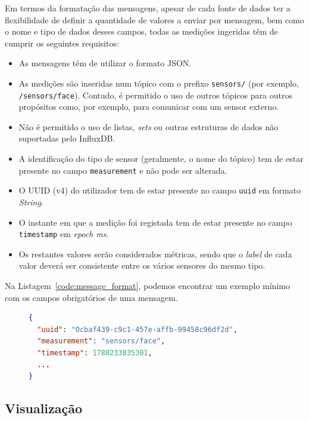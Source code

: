 Em termos da formatação das mensagens, apesar de cada fonte de dados ter a flexibilidade de definir a quantidade de valores a enviar por mensagem, bem como o nome e tipo de dados desses campos, todas as medições ingeridas têm de cumprir os seguintes requisitos:
\begin{itemize}
    \item As mensagens têm de utilizar o formato \ac{JSON}.
    \item As medições são inseridas num tópico com o prefixo \texttt{sensors/} (por exemplo, \texttt{/sensors/face}). Contudo, é permitido o uso de outros tópicos para outros propósitos como, por exemplo, para comunicar com um sensor externo.
    \item Não é permitido o uso de listas, \textit{sets} ou outras estruturas de dados não suportadas pelo InfluxDB.
    \item A identificação do tipo de sensor (geralmente, o nome do tópico) tem de estar presente no campo \texttt{measurement} e não pode ser alterada.
    \item O \ac{UUID} (v4) do utilizador tem de estar presente no campo \texttt{uuid} em formato \textit{String}.
    \item O instante em que a medição foi registada tem de estar presente no campo \texttt{timestamp} em \textit{epoch ms}.
    \item Os restantes valores serão considerados métricas, sendo que o \textit{label} de cada valor deverá ser consistente entre os vários sensores do mesmo tipo.
\end{itemize}

Na Listagem~\ref{code:message_format}, podemos encontrar um exemplo mínimo com os campos obrigatórios de uma mensagem.

\begin{figure}[h!]
\centering
\begin{minipage}{\textwidth}
\begin{lstlisting}[language=json, caption={Contrato mínimo de uma medição}, label={code:message_format}]
{
  "uuid": "Ocbaf439-c9c1-457e-affb-99458c96df2d",
  "measurement": "sensors/face",
  "timestamp": 1780233835301,
  ...
}
\end{lstlisting}
\end{minipage}
\end{figure}

\subsection{Visualização}

